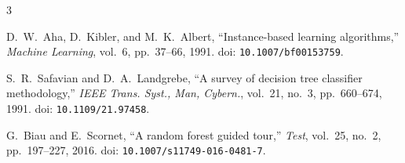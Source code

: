 \documentclass[12pt,a4paper]{article}
\begin{document}
\begin{thebibliography}{3}

D.~W.~Aha, D.~Kibler, and M.~K.~Albert,
``Instance-based learning algorithms,''
\emph{Machine Learning}, vol.~6, pp.~37--66, 1991.
doi: \texttt{10.1007/bf00153759}.

S.~R.~Safavian and D.~A.~Landgrebe,
``A survey of decision tree classifier methodology,''
\emph{IEEE Trans. Syst., Man, Cybern.}, vol.~21, no.~3, pp.~660--674, 1991.
doi: \texttt{10.1109/21.97458}.

G.~Biau and E.~Scornet,
``A random forest guided tour,''
\emph{Test}, vol.~25, no.~2, pp.~197--227, 2016.
doi: \texttt{10.1007/s11749-016-0481-7}.

\end{thebibliography}
\end{document}
